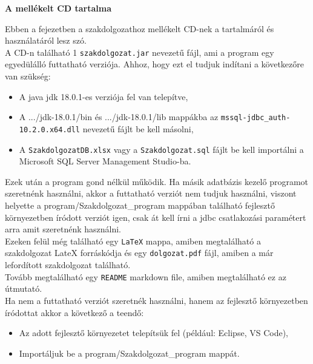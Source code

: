 \pagestyle{empty}

\noindent \textbf{\Large A mellékelt CD tartalma}

\vskip 1cm

Ebben a fejezetben a szakdolgozathoz mellékelt CD-nek a tartalmáról és használatáról lesz szó.\\
A CD-n található 1 \texttt{szakdolgozat.jar} nevezetű fájl, ami a program egy egyedülálló futtatható verziója. Ahhoz, hogy ezt el tudjuk indítani a következőre van szükség:
\begin{itemize}
	\item A java jdk 18.0.1-es verziója fel van telepítve,
	\item A .../jdk-18.0.1/bin és .../jdk-18.0.1/lib mappákba az \newline \texttt{mssql-jdbc\_auth-10.2.0.x64.dll} nevezetű fájlt be kell másolni,
	\item A \texttt{SzakdolgozatDB.xlsx} vagy a \texttt{Szakdolgozat.sql} fájlt be kell importálni a Microsoft SQL Server Management Studio-ba.
\end{itemize}
Ezek után a program gond nélkül működik. Ha másik adatbázis kezelő programot szeretnénk használni, akkor a futtatható verziót nem tudjuk használni, viszont helyette a program/Szakdolgozat\_program mappában található fejlesztő környezetben íródott verziót igen, csak át kell írni a jdbc csatlakozási paramétert arra amit szeretnénk használni.\\
Ezeken felül még található egy \texttt{LaTeX} mappa, amiben megtalálható a szakdolgozat LateX forráskódja és egy \texttt{dolgozat.pdf} fájl, amiben a már lefordított szakdolgozat található.\\
Tovább megtalálható egy \texttt{README} markdown file, amiben megtalálható ez az útmutató.\\
Ha nem a futtatható verziót szeretnék használni, hanem az fejlesztő környezetben íródottat akkor a következő a teendő:
\begin{itemize}
	\item Az adott fejlesztő környezetet telepítsük fel (például: Eclipse, VS Code),
	\item Importáljuk be a program/Szakdolgozat\_program mappát.
\end{itemize}


